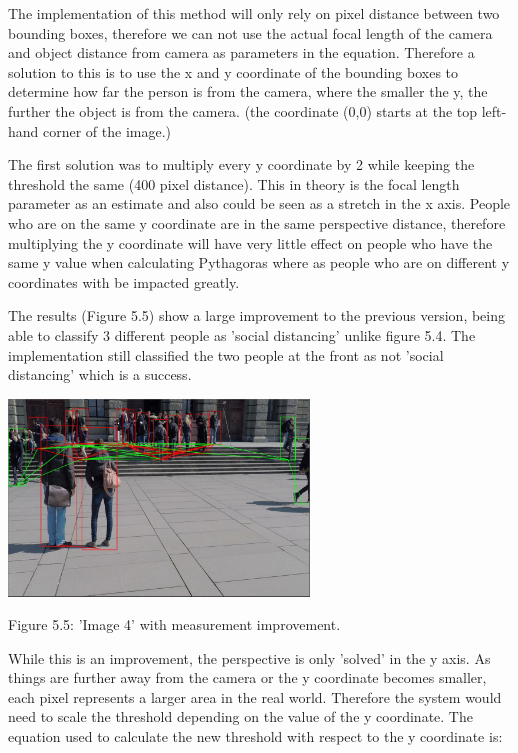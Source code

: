 \documentclass[12pt]{report}
\begin{document}
The implementation of this method will only rely on pixel distance between two bounding boxes, therefore we can not use the actual focal length of the camera and object distance from camera as parameters in the equation. Therefore a solution to this is to use the x and y coordinate of the bounding boxes to determine how far the person is from the camera, where the smaller the y, the further the object is from the camera. (the coordinate (0,0) starts at the top left-hand corner of the image.)

\vspace{2mm}

The first solution was to multiply every y coordinate by 2 while keeping the threshold the same (400 pixel distance). This in theory is the focal length parameter as an estimate and also could be seen as a stretch in the x axis. People who are on the same y coordinate are in the same perspective distance, therefore multiplying the y coordinate will have very little effect on people who have the same y value when calculating Pythagoras where as people who are on different y coordinates with be impacted greatly. 

\vspace{2mm}

The results (Figure 5.5) show a large improvement to the previous version, being able to classify 3 different people as 'social distancing' unlike figure 5.4. The implementation still classified the two people at the front as not 'social distancing' which is a success.

\begin{center}
	\includegraphics[width=80mm]{./images/appendix/PerspectiveSolution1.JPG}
	
	{\footnotesize Figure 5.5: 'Image 4' with measurement improvement.}
\end{center}

While this is an improvement, the perspective is only 'solved' in the y axis. As things are further away from the camera or the y coordinate becomes smaller, each pixel represents a larger area in the real world. Therefore the system would need to scale the threshold depending on the value of the y coordinate. The equation used to calculate the new threshold with respect to the y coordinate is:
\end{document}
